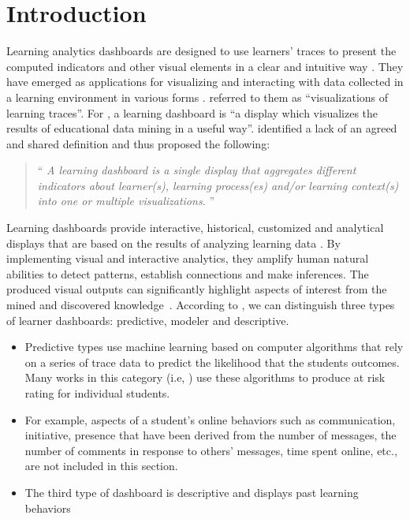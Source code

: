 \documentclass[manuscript,screen,nonacm,12pt]{acmart}
\begin{document}
\section{Introduction} 
Learning analytics dashboards are designed to use learners' traces to present the computed indicators and other visual elements in a clear and intuitive way \citep{Brouns2015}.
They have emerged as applications for visualizing and interacting with data collected in a learning environment in various forms \citep{Ramos2015}. \citet{Steiner2014} referred to them as ``visualizations of learning traces''. For \citet{Yoo2015}, a learning dashboard is ``a display which visualizes the results of educational data mining in a useful way''. 
\citet{Schwendimann2017} identified a lack of an agreed and shared definition and thus proposed the following:
\begin{quotation}
	``\textit{%
		A learning dashboard is a single display that aggregates different indicators
		about learner(s), learning process(es) and/or learning context(s) into one or
		multiple visualizations.
	}'' \citep{Schwendimann2017}
\end{quotation}
Learning dashboards provide interactive, historical, customized and analytical displays that are based on the results of  analyzing learning data \citep{Park2015, Kim2015}. By implementing visual and interactive analytics, they amplify human natural abilities to detect patterns, establish connections and make inferences. The produced visual outputs can significantly highlight aspects of interest from the mined and discovered knowledge~\citep{Duval2011}. According to \citet{bennett2019four}, we can distinguish  three types of learner dashboards: predictive, modeler and descriptive. 
\begin{itemize}
    \item Predictive types use machine learning based on computer algorithms that rely on a series of trace data to predict the likelihood that the students outcomes. Many works in this category (i.e, \citep{arnold2014exercise}) use these algorithms to produce at risk rating for individual students.
    \item For example, aspects of a student's online behaviors such as communication, initiative, presence that have been derived from the number of messages, the number of comments in response to others' messages, time spent online, etc., are not included in this section. 
    \item The third type of dashboard is descriptive and displays past learning behaviors
\end{itemize}
\end{document}
